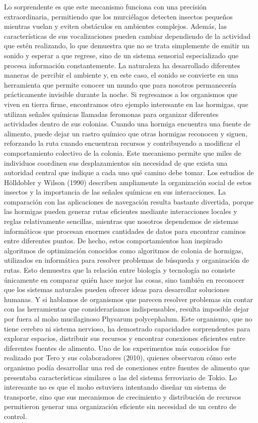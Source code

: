 \documentclass[12pt]{article}
\begin{document}
Lo sorprendente es que este mecanismo funciona con una precisión extraordinaria, permitiendo que los murciélagos detecten insectos pequeños mientras vuelan y eviten obstáculos en ambientes complejos. Además, las características de sus vocalizaciones pueden cambiar dependiendo de la actividad que estén realizando, lo que demuestra que no se trata simplemente de emitir un sonido y esperar a que regrese, sino de un sistema sensorial especializado que procesa información constantemente. La naturaleza ha desarrollado diferentes maneras de percibir el ambiente y, en este caso, el sonido se convierte en una herramienta que permite conocer un mundo que para nosotros permanecería prácticamente invisible durante la noche.
Si regresamos a los organismos que viven en tierra firme, encontramos otro ejemplo interesante en las hormigas, que utilizan señales químicas llamadas feromonas para organizar diferentes actividades dentro de sus colonias. Cuando una hormiga encuentra una fuente de alimento, puede dejar un rastro químico que otras hormigas reconocen y siguen, reforzando la ruta cuando encuentran recursos y contribuyendo a modificar el comportamiento colectivo de la colonia. Este mecanismo permite que miles de individuos coordinen sus desplazamientos sin necesidad de que exista una autoridad central que indique a cada uno qué camino debe tomar. Los estudios de Hölldobler y Wilson (1990) describen ampliamente la organización social de estos insectos y la importancia de las señales químicas en sus interacciones.
La comparación con las aplicaciones de navegación resulta bastante divertida, porque las hormigas pueden generar rutas eficientes mediante interacciones locales y reglas relativamente sencillas, mientras que nosotros dependemos de sistemas informáticos que procesan enormes cantidades de datos para encontrar caminos entre diferentes puntos. De hecho, estos comportamientos han inspirado algoritmos de optimización conocidos como algoritmos de colonia de hormigas, utilizados en informática para resolver problemas de búsqueda y organización de rutas. Esto demuestra que la relación entre biología y tecnología no consiste únicamente en comparar quién hace mejor las cosas, sino también en reconocer que los sistemas naturales pueden ofrecer ideas para desarrollar soluciones humanas.
Y si hablamos de organismos que parecen resolver problemas sin contar con las herramientas que consideraríamos indispensables, resulta imposible dejar por fuera al moho mucilaginoso Physarum polycephalum. Este organismo, que no tiene cerebro ni sistema nervioso, ha demostrado capacidades sorprendentes para explorar espacios, distribuir sus recursos y encontrar conexiones eficientes entre diferentes fuentes de alimento. Uno de los experimentos más conocidos fue realizado por Tero y sus colaboradores (2010), quienes observaron cómo este organismo podía desarrollar una red de conexiones entre fuentes de alimento que presentaba características similares a las del sistema ferroviario de Tokio. Lo interesante no es que el moho estuviera intentando diseñar un sistema de transporte, sino que sus mecanismos de crecimiento y distribución de recursos permitieron generar una organización eficiente sin necesidad de un centro de control.
\end{document}
